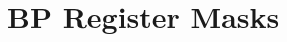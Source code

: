 \hypertarget{group___b_p___register___masks}{}\section{B\+P Register Masks}
\label{group___b_p___register___masks}
